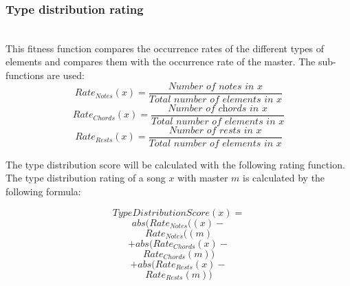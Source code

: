 \subsubsection{Type distribution rating}\mbox{}\\
This fitness function compares the occurrence rates of the different types of elements and compares them with the occurrence rate of the master. The sub-functions are used: 
\[ Rate_{Notes}(x) = \frac{\textit{Number of notes in x}}{\textit{Total number of elements in x} } \]
\[ Rate_{Chords}(x) = \frac{\textit{Number of chords in x}}{\textit{Total number of elements in x} } \]
\[ Rate_{Rests}(x) = \frac{\textit{Number of rests in x}}{\textit{Total number of elements in x} } \]


The type distribution score will be calculated with the following rating function. The type distribution rating of a song $x$ with master $m$ is calculated by the following formula:

\[ TypeDistributionScore(x) = \]
\[abs(Rate_{Notes}((x) - \]
\[Rate_{Notes}((m) \]
\[+ abs( Rate_{Chords}(x) - \]
\[Rate_{Chords}(m)) \]
\[+ abs( Rate_{Rests}(x) - \]
\[Rate_{Rests}(m)) \]
